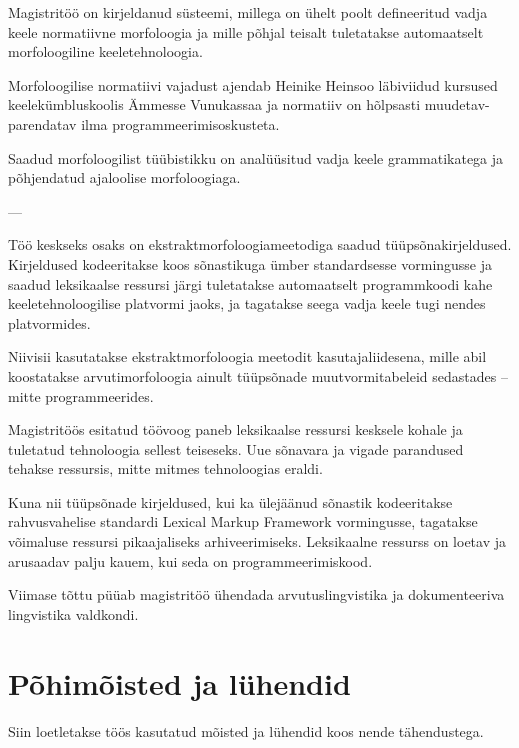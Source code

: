 \documentclass[12pt,a4paper]{article}
\begin{document}
Magistritöö on kirjeldanud süsteemi, millega on ühelt poolt defineeritud vadja keele normatiivne morfoloogia ja mille põhjal teisalt tuletatakse automaatselt morfoloogiline keeletehnoloogia.

Morfoloogilise normatiivi vajadust ajendab Heinike Heinsoo läbiviidud kursused keelekümbluskoolis Ämmesse Vunukassaa ja normatiiv on hõlpsasti muudetav-parendatav ilma programmeerimisoskusteta.

Saadud morfoloogilist tüübistikku on analüüsitud vadja keele grammatikatega ja põhjendatud ajaloolise morfoloogiaga.

---

Töö keskseks osaks on ekstraktmorfoloogiameetodiga saadud tüüpsõnakirjeldused.
Kirjeldused kodeeritakse koos sõnastikuga ümber standardsesse vormingusse ja saadud leksikaalse ressursi järgi tuletatakse automaatselt programmkoodi kahe keeletehnoloogilise platvormi jaoks, ja tagatakse seega vadja keele tugi nendes platvormides.

Niivisii kasutatakse ekstraktmorfoloogia meetodit kasutaja\-liidesena, mille abil koostatakse arvutimorfoloogia ainult tüüpsõnade muutvormitabeleid sedastades -- mitte programmeerides.

Magistritöös esitatud töövoog paneb leksikaalse ressursi kesksele kohale ja tuletatud tehnoloogia sellest teiseseks. Uue sõnavara ja vigade parandused tehakse ressursis, mitte mitmes tehnoloogias eraldi.

Kuna nii tüüpsõnade kirjeldused, kui ka ülejäänud sõnastik kodeeritakse rahvusvahelise standardi Lexical Markup Framework vormingusse, tagatakse võimaluse ressursi pikaajaliseks arhiveerimiseks. Leksikaalne ressurss on loetav ja arusaadav palju kauem, kui seda on programmeerimiskood.

Viimase tõttu püüab magistritöö ühendada arvutuslingvistika ja dokumenteeriva lingvistika valdkondi.







\newpage
\section{Põhimõisted ja lühendid}
\label{sec:põhimõisted}
Siin loetletakse töös kasutatud mõisted ja lühendid koos nende tähendustega.
\end{document}
